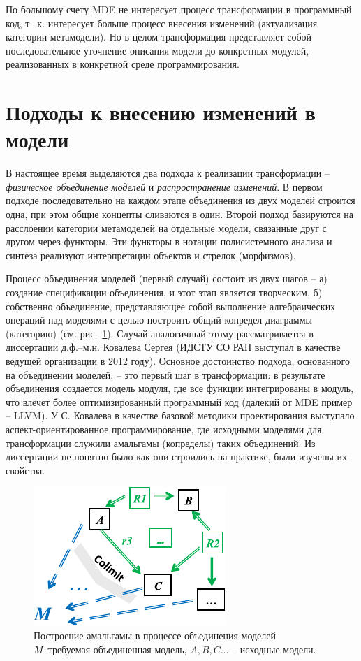 \documentclass[12pt,a4paper]{ltxdoc}
\begin{document}
По большому счету MDE не интересует процесс трансформации в программный код, т.~к. интересует больше процесс внесения изменений (актуализация категории метамодели). Но в целом трансформация представляет собой последовательное уточнение описания модели до конкретных модулей, реализованных в конкретной среде программирования.

\section{Подходы к внесению изменений в модели}
\label{sec:mde-conversions}

В настоящее время выделяются два подхода к реализации трансформации -- \emph{физическое объединение моделей} и \emph{распространение изменений}.  В первом подходе последовательно на каждом этапе объединения из двух моделей строится одна, при этом общие концепты сливаются в один.  Второй подход базируются на расслоении категории метамоделей на отдельные модели, связанные друг с другом через функторы.  Эти функторы в нотации полисистемного анализа и синтеза реализуют интерпретации объектов и стрелок (морфизмов).

Процесс объединения моделей (первый случай) состоит из двух шагов -- а) создание спецификации объединения, и этот этап является творческим, б) собственно объединение, представляющее собой выполнение алгебраических операций над моделями с целью построить общий копредел диаграммы (категорию) (см. рис.~\ref{fig:amalgama}).  Случай аналогичный этому рассматривается в диссертации д.ф.--м.н. Ковалева Сергея (ИДСТУ СО РАН выступал в качестве ведущей организации в 2012 году).  Основное достоинство подхода, основанного на объединении моделей, -- это первый шаг в трансформации: в результате объединения создается модель модуля, где все функции интегрированы в модуль, что влечет более оптимизированный программный код (далекий от MDE пример -- LLVM).  У С. Ковалева в качестве базовой методики проектирования выступало аспект-ориентированное программирование, где исходными моделями для трансформации служили амальгамы (копределы) таких объединений.  Из диссертации не понятно было как они строились на практике, были изучены их свойства.

\begin{figure}[htbp]
  \centering
  \includegraphics[width=0.5\linewidth]{amalgama}
  \caption{Построение амальгамы в процессе объединения моделей\\[0.3em]
    \protect\footnotesize{$M$--требуемая объединенная модель, $A,B,C\ldots$ -- исходные модели.}}
  \label{fig:amalgama}
\end{figure}
\end{document}
